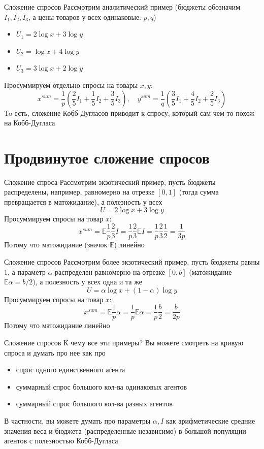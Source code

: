 \documentclass{beamer}
\begin{document}
\begin{frame}{Сложение спросов}
Рассмотрим аналитический пример (бюджеты обозначим $I_1, I_2, I_3$, а цены товаров у всех одинаковые: $p,q$)
\begin{itemize}
  \item $U_1 = 2 \log x + 3 \log y$
  \item $U_2 = \log x + 4\log y$
  \item $U_3 = 3\log x + 2\log y$
\end{itemize}
Просуммируем отдельно спросы на товары $x, y$:
$$ x^{sum} = \frac{1}{p}(\frac{2}{5}I_1 + \frac{1}{5}I_2 +\frac{3}{5}I_3), \quad y^{sum} = \frac{1}{q}(\frac{3}{5}I_1 + \frac{4}{5}I_2 +\frac{2}{5}I_3)$$
To есть, сложение Кобб-Дугласов приводит к спросу, который сам чем-то похож на Кобб-Дугласа
\end{frame}

\section{Продвинутое сложение спросов}

\begin{frame}{Сложение спроса}
Рассмотрим экзотический пример, пусть бюджеты распределены, например, равномерно на отрезке $[0,1]$ (тогда сумма превращается в матожидание), а полезность у всех
$$U = 2 \log x + 3 \log y$$
Просуммируем спросы на товар $x$:
$$ x^{sum} = \mathbb{E} \frac{1}{p} \frac{2}{3} I = \frac{1}{p} \frac{2}{3} \mathbb{E} I = \frac{1}{p} \frac{2}{3}\frac{1}{2} = \frac{1}{3p}$$
Потому что матожидание (значок $\mathbb{E}$) линейно
\end{frame}

\begin{frame}{Сложение спросов}
Рассмотрим более экзотический пример, пусть бюджеты равны 1, а параметр $\alpha$ распределен равномерно на отрезке $[0,b]$ (матожидание $\mathbb{E} \alpha = b/2$), а полезность у всех одна и та же
$$U = \alpha \log x + (1-\alpha) \log y$$
Просуммируем спросы на товар $x$:
$$ x^{sum} = \mathbb{E} \frac{1}{p} \alpha = \frac{1}{p} \mathbb{E} \alpha = \frac{1}{p} \frac{b}{2} = \frac{b}{2p}$$
Потому что матожидание линейно
\end{frame}

\begin{frame}{Сложение спросов}
К чему все эти примеры? Вы можете смотреть на кривую спроса и думать про нее как про
\begin{itemize}
  \item спрос одного единственного агента
  \item суммарный спрос большого кол-ва одинаковых агентов
  \item суммарный спрос большого кол-ва разных агентов
\end{itemize}
В частности, вы можете думать про параметры $\alpha, I$ как \alert{арифметические средние} значения веса и бюджета (распределенные независимо) в большой популяции агентов с полезностью Кобб-Дугласа.
\end{frame}
\end{document}
